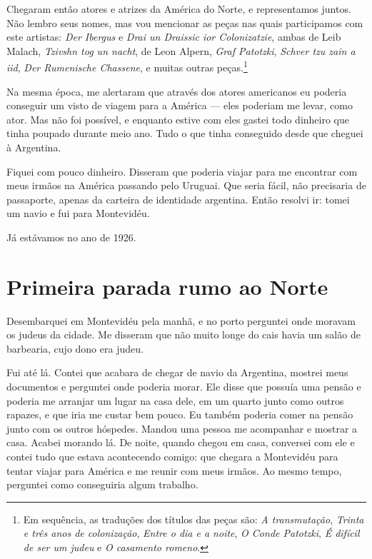 Chegaram então atores e atrizes da América do Norte, e
representamos juntos. Não lembro seus nomes, mas vou mencionar as peças nas
quais participamos com este artistas: \textit{Der Ibergus} e \textit{Drai un Draissic ior Colonizatzie}, ambas de Leib Malach, \textit{Tzivshn tog un nacht}, de Leon Alpern, \textit{Graf Patotzki}, \textit{Schver tzu zain a iid}, \textit{Der Rumenische Chassene}, e
muitas outras peças.\footnote{Em sequência, as traduções dos títulos das peças são: \textit{A transmutação}, \textit{Trinta e três anos de colonização}, \textit{Entre o dia e a noite}, \textit{O Conde Patotzki}, \textit{É difícil de ser um judeu} e \textit{O casamento romeno}.}

Na mesma época, me alertaram que através dos atores americanos 
eu poderia conseguir um visto de viagem para a América --- eles poderiam me levar, como ator. Mas não foi possível, e
enquanto estive com eles gastei todo dinheiro que tinha poupado
durante meio ano. Tudo o que tinha conseguido desde que cheguei à Argentina.

Fiquei com pouco dinheiro. Disseram que poderia viajar
para me encontrar com meus irmãos na América passando pelo Uruguai.
Que seria fácil, não precisaria de passaporte, apenas da
carteira de identidade argentina. Então resolvi ir: tomei um navio e fui
para Montevidéu.

Já estávamos no ano de 1926.


\chapter{Primeira parada rumo ao Norte}

Desembarquei em Montevidéu pela manhã, e no porto perguntei 
onde moravam os judeus da cidade. Me disseram que não muito
longe do cais havia um salão de barbearia, cujo dono era judeu.

Fui até lá. Contei que acabara de chegar de navio da Argentina, mostrei
meus documentos e perguntei onde poderia morar. Ele disse que possuía
uma pensão e poderia me arranjar um lugar na casa dele, em um
quarto junto como outros rapazes, e que iria me custar bem pouco. Eu
 também poderia comer na pensão junto com os outros hóspedes. Mandou uma
pessoa me acompanhar e mostrar a casa. Acabei morando lá. De noite,
quando chegou em casa, conversei com ele e contei tudo que estava
acontecendo comigo: que chegara a Montevidéu para tentar
viajar para América e me reunir com meus irmãos. Ao mesmo tempo,
perguntei como conseguiria algum trabalho.

